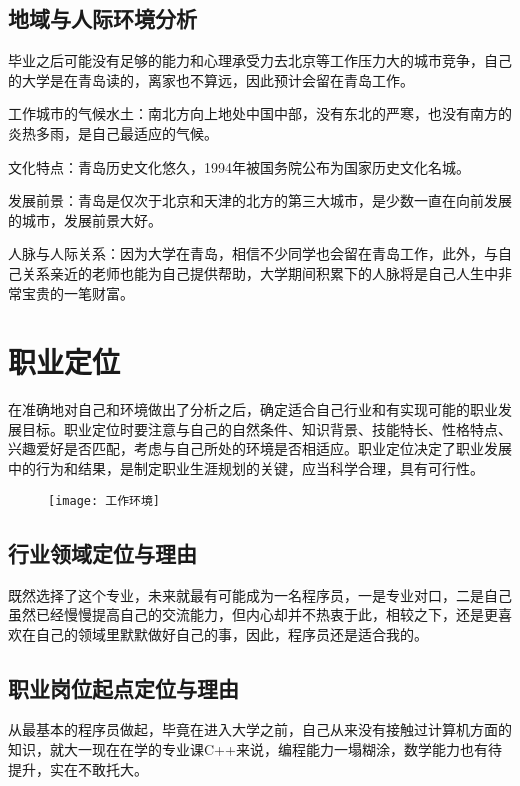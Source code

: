 \documentclass{article}
\begin{document}
\subsection{地域与人际环境分析}
毕业之后可能没有足够的能力和心理承受力去北京等工作压力大的城市竞争，自己的大学是在青岛读的，离家也不算远，因此预计会留在青岛工作。\par
工作城市的气候水土：南北方向上地处中国中部，没有东北的严寒，也没有南方的炎热多雨，是自己最适应的气候。\par
文化特点：青岛历史文化悠久，1994年被国务院公布为国家历史文化名城。\par
发展前景：青岛是仅次于北京和天津的北方的第三大城市，是少数一直在向前发展的城市，发展前景大好。\par
人脉与人际关系：因为大学在青岛，相信不少同学也会留在青岛工作，此外，与自己关系亲近的老师也能为自己提供帮助，大学期间积累下的人脉将是自己人生中非常宝贵的一笔财富。\par
\par 

\section{职业定位}
在准确地对自己和环境做出了分析之后，确定适合自己行业和有实现可能的职业发展目标。职业定位时要注意与自己的自然条件、知识背景、技能特长、性格特点、兴趣爱好是否匹配，考虑与自己所处的环境是否相适应。职业定位决定了职业发展中的行为和结果，是制定职业生涯规划的关键，应当科学合理，具有可行性。\par

\begin{figure}[H]
\centering
\texttt{[image: 工作环境]}
\label{fig:universe}
\end{figure}
\subsection{行业领域定位与理由}
既然选择了这个专业，未来就最有可能成为一名程序员，一是专业对口，二是自己虽然已经慢慢提高自己的交流能力，但内心却并不热衷于此，相较之下，还是更喜欢在自己的领域里默默做好自己的事，因此，程序员还是适合我的。\par
\subsection{职业岗位起点定位与理由}
从最基本的程序员做起，毕竟在进入大学之前，自己从来没有接触过计算机方面的知识，就大一现在在学的专业课C++来说，编程能力一塌糊涂，数学能力也有待提升，实在不敢托大。\par
\end{document}
